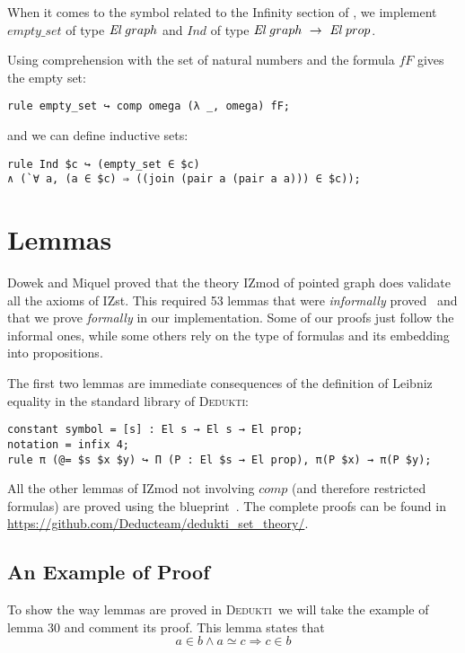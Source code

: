\documentclass[submission,copyright,creativecommons]{eptcs}
\def\ra{\rightarrow}
\def\El{{\mbox{\it El}}}
\def\imp{\mathbin{\Rightarrow}}
\def\conj{\mathbin{\wedge}}
\newcommand{\dedukti}{\textsc{Dedukti}}
\begin{document}
When it comes to the symbol related to the Infinity section of \cite[see Section 2.1]{zermodulo}, we implement $empty\_set$ of type $\El~graph$ and $Ind$ of type $\El~graph \ \ra \ \El~prop$.

Using comprehension with the set of natural numbers and the formula $fF$ gives the empty set:
\begin{lstlisting}
rule empty_set ↪ comp omega (λ _, omega) fF;
\end{lstlisting}

and we can define inductive sets:

\begin{lstlisting}
rule Ind $c ↪ (empty_set ∈ $c) 
∧ (`∀ a, (a ∈ $c) ⇒ ((join (pair a (pair a a))) ∈ $c));
\end{lstlisting}

\section{Lemmas}

Dowek and Miquel proved that the theory IZmod of pointed graph does validate all the axioms of IZst. This required 53 lemmas that were \textit{informally} proved~\cite[see Tables 4 and 5]{zermodulo} and that we prove \textit{formally} in our implementation. Some of our proofs just follow the informal ones, while some others rely on the type of formulas and its embedding into propositions. 

The first two lemmas are immediate consequences of the definition of Leibniz equality in the standard library of \dedukti:
\begin{lstlisting}
constant symbol = [s] : El s → El s → El prop;
notation = infix 4;
rule π (@= $s $x $y) ↪ Π (P : El $s → El prop), π(P $x) → π(P $y);
\end{lstlisting}

All the other lemmas of IZmod not involving $comp$ (and therefore restricted formulas) are proved using the blueprint~\cite[see Proposition 1]{zermodulo53}. The complete proofs can be found in \url{https://github.com/Deducteam/dedukti_set_theory/}.

\subsection{An Example of Proof}

To show the way lemmas are proved in \dedukti ~we will take the example of lemma 30 and comment its proof. This lemma states that $$ a \in b \conj a \simeq c \imp c \in b $$
\end{document}
